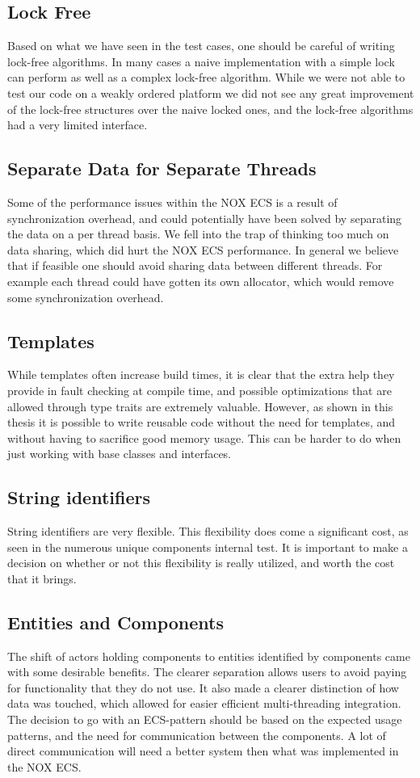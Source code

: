 \subsection{Lock Free}
Based on what we have seen in the test cases, one should be careful of writing lock-free algorithms.
In many cases a naive implementation with a simple lock can perform as well as a complex lock-free algorithm.
While we were not able to test our code on a weakly ordered platform we did not see any great improvement
of the lock-free structures over the naive locked ones, and the lock-free algorithms had a very limited interface.

\subsection{Separate Data for Separate Threads}
Some of the performance issues within the NOX ECS is a result of synchronization overhead,
and could potentially have been solved by separating the data on a per thread basis.
We fell into the trap of thinking too much on data sharing, which did hurt the NOX ECS performance.
In general we believe that if feasible one should avoid sharing data between different threads.
For example each thread could have gotten its own allocator, which would remove some synchronization overhead.

\subsection{Templates}
While templates often increase build times, it is clear that the extra help they provide in
fault checking at compile time, and possible optimizations that are allowed through type traits
are extremely valuable.
However, as shown in this thesis it is possible to write reusable code without the need for templates,
and without having to sacrifice good memory usage. This can be harder to do when just working with
base classes and interfaces.

\subsection{String identifiers}
String identifiers are very flexible. This flexibility does come a significant cost, as seen
in the numerous unique components internal test.
It is important to make a decision on whether or not this flexibility is really utilized, and worth
the cost that it brings.

\subsection{Entities and Components}
The shift of actors holding components to entities identified by components came with some
desirable benefits. The clearer separation allows users to avoid paying for functionality that they
do not use. It also made a clearer distinction of how data was touched, which allowed for easier efficient
multi-threading integration.
The decision to go with an ECS-pattern should be based on the expected usage patterns, and the
need for communication between the components.
A lot of direct communication will need a better system then what was implemented in the NOX ECS.

